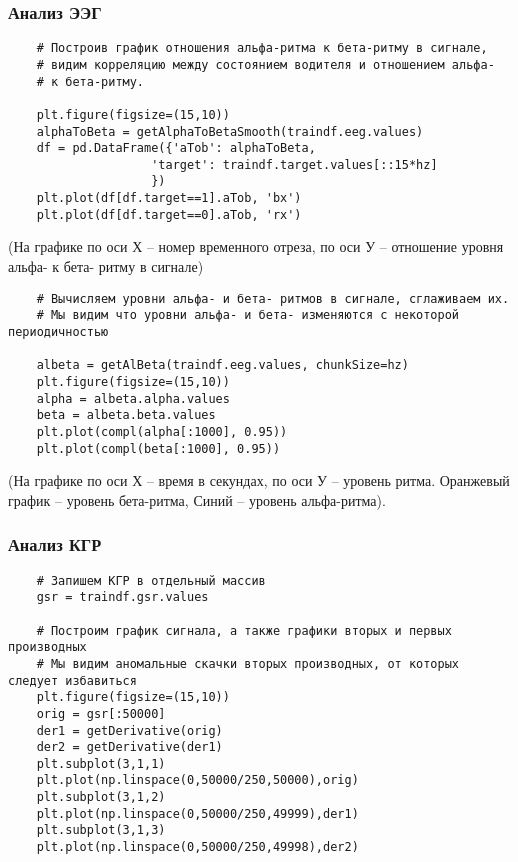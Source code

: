 \subsubsection*{Анализ ЭЭГ}

\begin{verbatim}
    # Построив график отношения альфа-ритма к бета-ритму в сигнале,
    # видим корреляцию между состоянием водителя и отношением альфа-
    # к бета-ритму.

    plt.figure(figsize=(15,10))
    alphaToBeta = getAlphaToBetaSmooth(traindf.eeg.values)
    df = pd.DataFrame({'aTob': alphaToBeta,
                    'target': traindf.target.values[::15*hz]
                    })
    plt.plot(df[df.target==1].aTob, 'bx')
    plt.plot(df[df.target==0].aTob, 'rx')
\end{verbatim}


(На графике по оси Х – номер временного отреза, по оси У – отношение уровня альфа- к бета- ритму в сигнале)

\begin{verbatim}
    # Вычисляем уровни альфа- и бета- ритмов в сигнале, сглаживаем их.
    # Мы видим что уровни альфа- и бета- изменяются с некоторой периодичностью

    albeta = getAlBeta(traindf.eeg.values, chunkSize=hz)
    plt.figure(figsize=(15,10))
    alpha = albeta.alpha.values
    beta = albeta.beta.values
    plt.plot(compl(alpha[:1000], 0.95))
    plt.plot(compl(beta[:1000], 0.95))
\end{verbatim}


(На графике по оси Х – время в секундах, по оси У – уровень ритма. Оранжевый график – уровень бета-ритма, Синий – уровень альфа-ритма).

\subsubsection*{Анализ КГР}

\begin{verbatim}
    # Запишем КГР в отдельный массив
    gsr = traindf.gsr.values

    # Построим график сигнала, а также графики вторых и первых производных
    # Мы видим аномальные скачки вторых производных, от которых следует избавиться
    plt.figure(figsize=(15,10))
    orig = gsr[:50000]
    der1 = getDerivative(orig)
    der2 = getDerivative(der1)
    plt.subplot(3,1,1)
    plt.plot(np.linspace(0,50000/250,50000),orig)
    plt.subplot(3,1,2)
    plt.plot(np.linspace(0,50000/250,49999),der1)
    plt.subplot(3,1,3)
    plt.plot(np.linspace(0,50000/250,49998),der2)
\end{verbatim}

